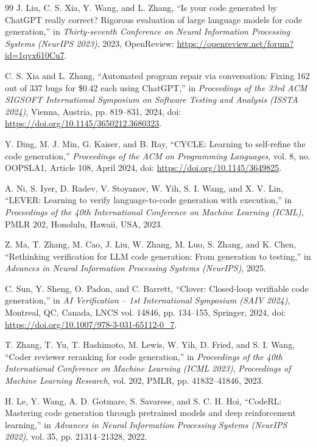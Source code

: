 \documentclass[10pt,a4paper]{article}
\begin{document}
\begin{thebibliography}{99}
J. Liu, C. S. Xia, Y. Wang, and L. Zhang, ``Is your code generated by ChatGPT really correct? Rigorous evaluation of large language models for code generation,'' in \textit{Thirty-seventh Conference on Neural Information Processing Systems (NeurIPS 2023)}, 2023, OpenReview: \url{https://openreview.net/forum?id=1qvx610Cu7}.

C. S. Xia and L. Zhang, ``Automated program repair via conversation: Fixing 162 out of 337 bugs for \$0.42 each using ChatGPT,'' in \textit{Proceedings of the 33rd ACM SIGSOFT International Symposium on Software Testing and Analysis (ISSTA 2024)}, Vienna, Austria, pp. 819--831, 2024, doi: \url{https://doi.org/10.1145/3650212.3680323}.

Y. Ding, M. J. Min, G. Kaiser, and B. Ray, ``CYCLE: Learning to self-refine the code generation,'' \textit{Proceedings of the ACM on Programming Languages}, vol. 8, no. OOPSLA1, Article 108, April 2024, doi: \url{https://doi.org/10.1145/3649825}.

A. Ni, S. Iyer, D. Radev, V. Stoyanov, W. Yih, S. I. Wang, and X. V. Lin, ``LEVER: Learning to verify language-to-code generation with execution,'' in \textit{Proceedings of the 40th International Conference on Machine Learning (ICML)}, PMLR 202, Honolulu, Hawaii, USA, 2023.

Z. Ma, T. Zhang, M. Cao, J. Liu, W. Zhang, M. Luo, S. Zhang, and K. Chen, ``Rethinking verification for LLM code generation: From generation to testing,'' in \textit{Advances in Neural Information Processing Systems (NeurIPS)}, 2025.

C. Sun, Y. Sheng, O. Padon, and C. Barrett, ``Clover: Closed-loop verifiable code generation,'' in \textit{AI Verification -- 1st International Symposium (SAIV 2024)}, Montreal, QC, Canada, LNCS vol. 14846, pp. 134--155, Springer, 2024, doi: \url{https://doi.org/10.1007/978-3-031-65112-0_7}.

T. Zhang, T. Yu, T. Hashimoto, M. Lewis, W. Yih, D. Fried, and S. I. Wang, ``Coder reviewer reranking for code generation,'' in \textit{Proceedings of the 40th International Conference on Machine Learning (ICML 2023)}, \textit{Proceedings of Machine Learning Research}, vol. 202, PMLR, pp. 41832--41846, 2023.

H. Le, Y. Wang, A. D. Gotmare, S. Savarese, and S. C. H. Hoi, ``CodeRL: Mastering code generation through pretrained models and deep reinforcement learning,'' in \textit{Advances in Neural Information Processing Systems (NeurIPS 2022)}, vol. 35, pp. 21314--21328, 2022.


\end{thebibliography}
\end{document}
